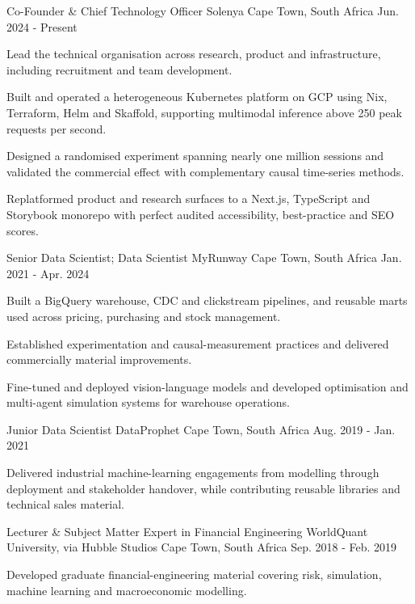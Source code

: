 \begin{cventries}
  \cventry
  {Co-Founder \& Chief Technology Officer}
  {Solenya}
  {Cape Town, South Africa}
  {Jun. 2024 - Present}
  {
    \begin{cvitems}
    \item {Lead the technical organisation across research, product
      and infrastructure, including recruitment and team development.}
    \item {Built and operated a heterogeneous Kubernetes platform on
        GCP using Nix, Terraform, Helm and Skaffold, supporting
      multimodal inference above 250 peak requests per second.}
    \item {Designed a randomised experiment spanning nearly one
        million sessions and validated the commercial effect with
      complementary causal time-series methods.}
    \item {Replatformed product and research surfaces to a Next.js,
        TypeScript and Storybook monorepo with perfect audited
      accessibility, best-practice and SEO scores.}
    \end{cvitems}
  }

  \cventry
  {Senior Data Scientist; Data Scientist}
  {MyRunway}
  {Cape Town, South Africa}
  {Jan. 2021 - Apr. 2024}
  {
    \begin{cvitems}
    \item {Built a BigQuery warehouse, CDC and clickstream pipelines,
      and reusable marts used across pricing, purchasing and stock management.}
    \item {Established experimentation and causal-measurement
      practices and delivered commercially material improvements.}
    \item {Fine-tuned and deployed vision-language models and
        developed optimisation and multi-agent simulation systems for
      warehouse operations.}
    \end{cvitems}
  }

  \cventry
  {Junior Data Scientist}
  {DataProphet}
  {Cape Town, South Africa}
  {Aug. 2019 - Jan. 2021}
  {
    \begin{cvitems}
    \item {Delivered industrial machine-learning engagements from
        modelling through deployment and stakeholder handover, while
      contributing reusable libraries and technical sales material.}
    \end{cvitems}
  }

  \cventry
  {Lecturer \& Subject Matter Expert in Financial Engineering}
  {WorldQuant University, via Hubble Studios}
  {Cape Town, South Africa}
  {Sep. 2018 - Feb. 2019}
  {
    \begin{cvitems}
    \item {Developed graduate financial-engineering material covering
      risk, simulation, machine learning and macroeconomic modelling.}
    \end{cvitems}
  }
\end{cventries}
